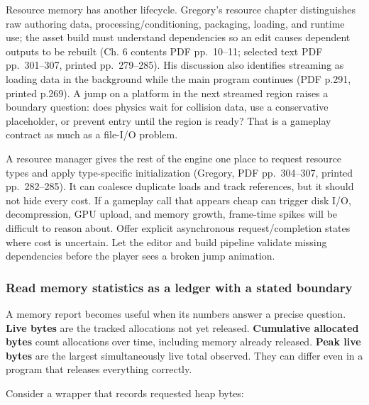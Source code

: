 Resource memory has another lifecycle. Gregory's resource chapter distinguishes raw authoring data, processing/conditioning, packaging, loading, and runtime use; the asset build must understand dependencies so an edit causes dependent outputs to be rebuilt (Ch. 6 contents PDF pp.~10--11; selected text PDF pp.~301--307, printed pp.~279--285). His discussion also identifies streaming as loading data in the background while the main program continues (PDF p.291, printed p.269). A jump on a platform in the next streamed region raises a boundary question: does physics wait for collision data, use a conservative placeholder, or prevent entry until the region is ready? That is a gameplay contract as much as a file-I/O problem.

A resource manager gives the rest of the engine one place to request resource types and apply type-specific initialization (Gregory, PDF pp.~304--307, printed pp.~282--285). It can coalesce duplicate loads and track references, but it should not hide every cost. If a gameplay call that appears cheap can trigger disk I/O, decompression, GPU upload, and memory growth, frame-time spikes will be difficult to reason about. Offer explicit asynchronous request/completion states where cost is uncertain. Let the editor and build pipeline validate missing dependencies before the player sees a broken jump animation.

\subsubsection{Read memory statistics as a ledger with a stated boundary}\label{05-engine-i-ch014-read-memory-statistics-as-a-ledger-with-a-stated-boundary}

\hypertarget{05-engine-i-ch014-read-memory-statistics-as-a-ledger-with-a-stated-boundary}{}

A memory report becomes useful when its numbers answer a precise question. \textbf{Live bytes} are the tracked allocations not yet released. \textbf{Cumulative allocated bytes} count allocations over time, including memory already released. \textbf{Peak live bytes} are the largest simultaneously live total observed. They can differ even in a program that releases everything correctly.

Consider a wrapper that records requested heap bytes:

